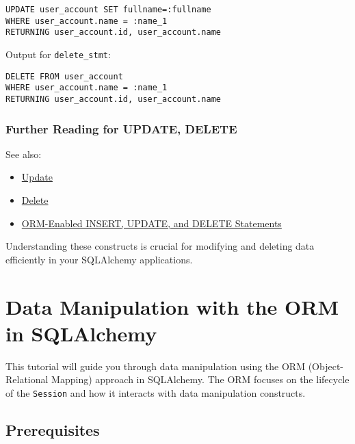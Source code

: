 \documentclass[
  letterpaper,
  DIV=11,
  numbers=noendperiod]{scrreprt}
\providecommand{\tightlist}{%
  \setlength{\itemsep}{0pt}\setlength{\parskip}{0pt}}\usepackage{longtable,booktabs,array}
\begin{document}
\begin{verbatim}
UPDATE user_account SET fullname=:fullname
WHERE user_account.name = :name_1
RETURNING user_account.id, user_account.name
\end{verbatim}

Output for \texttt{delete\_stmt}:

\begin{verbatim}
DELETE FROM user_account
WHERE user_account.name = :name_1
RETURNING user_account.id, user_account.name
\end{verbatim}

\subsection{Further Reading for UPDATE,
DELETE}\label{further-reading-for-update-delete}

See also:

\begin{itemize}
\tightlist
\item
  \href{https://docs.sqlalchemy.org/en/14/core/dml.html\#sqlalchemy.sql.expression.Update}{Update}
\item
  \href{https://docs.sqlalchemy.org/en/14/core/dml.html\#sqlalchemy.sql.expression.Delete}{Delete}
\item
  \href{https://docs.sqlalchemy.org/en/14/orm/query.html\#orm-enabled-insert-update-and-delete}{ORM-Enabled
  INSERT, UPDATE, and DELETE Statements}
\end{itemize}

Understanding these constructs is crucial for modifying and deleting
data efficiently in your SQLAlchemy applications.


\chapter{Data Manipulation with the ORM in
SQLAlchemy}\label{data-manipulation-with-the-orm-in-sqlalchemy}

This tutorial will guide you through data manipulation using the ORM
(Object-Relational Mapping) approach in SQLAlchemy. The ORM focuses on
the lifecycle of the \texttt{Session} and how it interacts with data
manipulation constructs.

\section{Prerequisites}\label{prerequisites-1}
\end{document}
